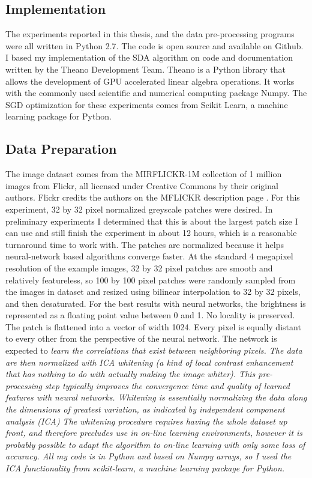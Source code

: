 \documentclass[12pt]{article}
\begin{document}
\begin{doublespacing}
	\subsection{Implementation} 
	The experiments reported in this thesis, and the data pre-processing programs were all written in Python 2.7. The code is open source and available on Github\cite{nifong13}.  I based my implementation of the SDA algorithm on code and documentation written by the Theano Development Team. Theano is a Python library that allows the development of GPU accelerated linear algebra operations. It works with the commonly used scientific and numerical computing package Numpy. The SGD optimization for these experiments comes from Scikit Learn, a machine learning package for Python.

	\subsection{Data Preparation}
	The image dataset comes from the MIRFLICKR-1M collection of 1 million images from Flickr, all licensed under Creative Commons by their original authors. Flickr credits the authors on the MFLICKR description page \cite{huiskes08}. For this experiment, 32 by 32 pixel normalized greyscale patches were desired. In preliminary experiments I determined that this is about the largest patch size I can use and still finish the experiment in about 12 hours, which is a reasonable turnaround time to work with. The patches are normalized because it helps neural-network based algorithms converge faster. At the standard 4 megapixel resolution of the example images, 32 by 32 pixel patches are smooth and relatively featureless, so 100 by 100 pixel patches were randomly sampled from the images in dataset and resized using bilinear interpolation to 32 by 32 pixels, and then desaturated. For the best results with neural networks, the brightness is represented as a floating point value between 0 and 1. No locality is preserved. The patch is flattened into a vector of width 1024. Every pixel is equally distant to every other from the perspective of the neural network. The network is expected to \em learn \em the correlations that exist between neighboring pixels. The data are then normalized with ICA whitening (a kind of local contrast enhancement that has nothing to do with actually making the image whiter). This pre-processing step typically improves the convergence time and quality of learned features with neural networks. Whitening is essentially normalizing the data along the dimensions of greatest variation, as indicated by independent component analysis (ICA) The whitening procedure requires having the whole dataset up front, and therefore precludes use in on-line learning environments, however it is probably possible to adapt the algorithm to on-line learning with only some loss of accuracy. All my code is in Python and based on Numpy arrays, so I used the ICA functionality from scikit-learn, a machine learning package for Python. 
	

\end{doublespacing}
\end{document}
